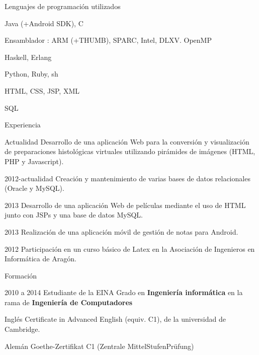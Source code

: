 \begin{cv}{}
\vspace{2em}

\begin{cvlist}{Lenguajes de programación utilizados}
\item Java (+Android SDK), C
\item Ensamblador : ARM (+THUMB), SPARC, Intel, DLXV. OpenMP
\item Haskell, Erlang
\item Python, Ruby, sh
\item HTML, CSS, JSP, XML
\item SQL
\end{cvlist}

\begin{cvlist}{Experiencia}
	\item[Actualidad] Desarrollo de una aplicación Web para la conversión y 
	visualización de preparaciones histológicas virtuales utilizando pirámides 
	de imágenes (HTML, PHP y Javascript).

	\item[2012-actualidad] Creación y mantenimiento de varias bases de datos
	relacionales (Oracle y MySQL).
	
	\item[2013] Desarrollo de una aplicación Web de películas mediante el uso
	de HTML junto con JSPs y una base de datos MySQL.
	
	\item[2013] Realización de una aplicación móvil de gestión de notas para Android.

	\item[2012] Participación en un curso básico de Latex en la Asociación de Ingenieros 
	en Informática de Aragón.
	
\end{cvlist}

\begin{cvlist}{Formación}

	\item[2010 a 2014] Estudiante de la EINA
		Grado en \textbf{Ingeniería informática} en la rama de \textbf{Ingeniería de Computadores}\\
	\item[Inglés] Certificate in Advanced English (equiv. C1), de la universidad de Cambridge.
	\item[Alemán] Goethe-Zertifikat C1 (Zentrale MittelStufenPrüfung)
\end{cvlist}

\end{cv}